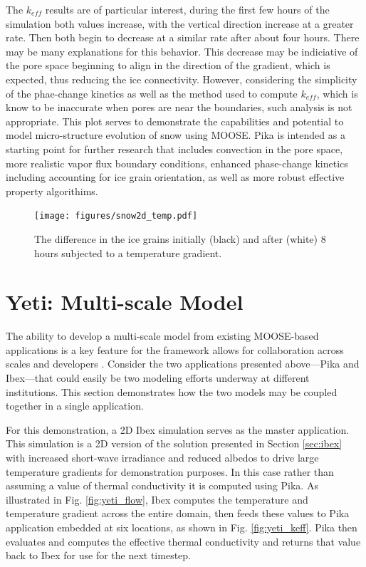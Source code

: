 The $k_{eff}$ results are of particular interest, during the first few hours of the simulation both values increase, with the vertical direction increase at a greater rate. Then both begin to decrease at a similar rate after about four hours. There may be many explanations for this behavior. This decrease may be indiciative of the pore space beginning to align in the direction of the gradient, which is expected, thus reducing the ice connectivity. However, considering the simplicity of the phae-change kinetics as well as the method used to compute $k_{eff}$, which is know to be inaccurate when pores are near the boundaries, such analysis is not appropriate. This plot serves to demonstrate the capabilities and potential to model micro-structure evolution of snow using MOOSE. Pika is intended as a starting point for further research that includes convection in the pore space, more realistic vapor flux boundary conditions, enhanced phase-change kinetics including accounting for ice grain orientation, as well as more robust effective property algorithims.



\begin{figure}[!ht]
  \texttt{[image: figures/snow2d\_temp.pdf]}
  \caption{The difference in the ice grains initially (black) and after (white) 8 hours subjected to a  temperature gradient.}
  \label{fig:snow2d:grains}
\end{figure}


\section{Yeti: Multi-scale Model}\label{sec:yeti}
The ability to develop a multi-scale model from existing MOOSE-based applications is a key feature for the framework allows for collaboration across scales and developers \citet{gaston2014physics}. Consider the two applications presented above---Pika and Ibex---that could easily be two modeling efforts underway at different institutions. This section demonstrates how the two models may be coupled together in a single application.

For this demonstration, a 2D Ibex simulation serves as the master application. This simulation is a 2D version of the solution presented in Section \ref{sec:ibex} with increased short-wave irradiance and reduced albedos to drive large temperature gradients for demonstration purposes. In this case rather than assuming a value of thermal conductivity it is computed using Pika. As illustrated in Fig. \ref{fig:yeti_flow}, Ibex computes the temperature and temperature gradient across the entire domain, then feeds these values to Pika application embedded at six locations, as shown in Fig. \ref{fig:yeti_keff}. Pika then evaluates and computes the effective thermal conductivity and returns that value back to Ibex for use for the next timestep.

